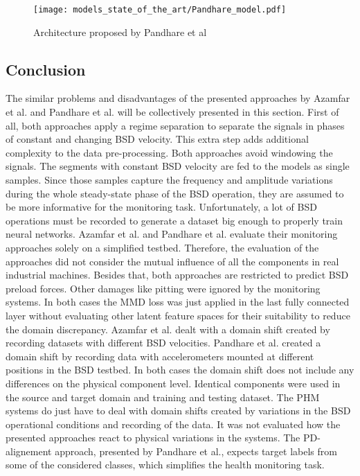 \begin{figure}[H]
  \centering
  \texttt{[image: models\_state\_of\_the\_art/Pandhare\_model.pdf]}
  \caption{Architecture proposed by Pandhare et al \cite{Pandhare2021}}
  \label{fig:Pandhare_model}
\end{figure}

\subsection{Conclusion}
The similar problems and disadvantages of the presented approaches by Azamfar et al. \cite{AZAMFAR2020103932} and Pandhare et al. \cite{Pandhare2021} will be collectively presented in this section. First of all, both approaches apply a regime separation to separate the signals in phases of constant and changing BSD velocity. This extra step adds additional complexity to the data pre-processing. Both approaches avoid windowing the signals. The segments with constant BSD velocity are fed to the models as single samples. Since those samples capture the frequency and amplitude variations during the whole steady-state phase of the BSD operation, they are assumed to be more informative for the monitoring task. Unfortunately, a lot of BSD operations must be recorded to generate a dataset big enough to properly train neural networks. Azamfar et al. and  Pandhare et al. evaluate their monitoring approaches solely on a simplified testbed. Therefore, the evaluation of the approaches did not consider the mutual influence of all the components in real industrial machines. Besides that, both approaches are restricted to predict BSD preload forces. Other damages like pitting were ignored by the monitoring systems. In both cases the MMD loss was just applied in the last fully connected layer without evaluating other latent feature spaces for their suitability to reduce the domain discrepancy. Azamfar et al. dealt with a domain shift created by recording datasets with different BSD velocities. Pandhare et al. created a domain shift by recording data with accelerometers mounted at different positions in the BSD testbed. In both cases the domain shift does not include any differences on the physical component level. Identical components were used in the source and target domain and training and testing dataset. The PHM systems do just have to deal with domain shifts created by variations in the BSD operational conditions and recording of the data. It was not evaluated how the presented approaches react to physical variations in the systems. The PD-alignement approach, presented by Pandhare et al., expects target labels from some of the considered classes, which simplifies the health monitoring task.


